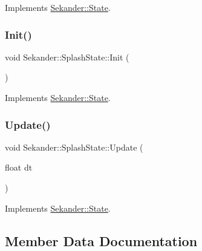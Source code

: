 Implements \hyperlink{classSekander_1_1State_ad55ae42f5887db5745fda9f2bd30aaa3}{Sekander\+::\+State}.

\mbox{\label{classSekander_1_1SplashState_adefc71fa2623180deda8391d4e64b04c}} 
\subsubsection{\texorpdfstring{Init()}{Init()}}
{\footnotesize\ttfamily void Sekander\+::\+Splash\+State\+::\+Init (\begin{DoxyParamCaption}{ }\end{DoxyParamCaption})\hspace{0.3cm}{\ttfamily [virtual]}}



Implements \hyperlink{classSekander_1_1State_a171be4b77d4c13e01849b867bd3fa8f5}{Sekander\+::\+State}.

\mbox{\label{classSekander_1_1SplashState_ac7121b90b97b7d9cdb5774bdc0c6cc2d}} 
\subsubsection{\texorpdfstring{Update()}{Update()}}
{\footnotesize\ttfamily void Sekander\+::\+Splash\+State\+::\+Update (\begin{DoxyParamCaption}\item[{float}]{dt }\end{DoxyParamCaption})\hspace{0.3cm}{\ttfamily [virtual]}}



Implements \hyperlink{classSekander_1_1State_a08d49e399db6f68247f410f7fddc7963}{Sekander\+::\+State}.



\subsection{Member Data Documentation}
\mbox{\label{classSekander_1_1SplashState_a138c6168e7a3f910ec07e5358d885d5f}} 
